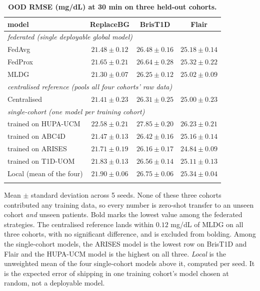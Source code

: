 \documentclass[10pt,letterpaper]{article}
\newlength\savedwidth
\newcommand\thickhline{\noalign{\global\savedwidth\arrayrulewidth\global\arrayrulewidth 2pt}%
\hline
\noalign{\global\arrayrulewidth\savedwidth}}
\begin{document}
\begin{table}[!ht]
\centering
\captionsetup{justification=centering,singlelinecheck=on}
\caption{\bf OOD RMSE (mg/dL) at 30 min on three held-out cohorts.}
\label{tab:ood}
\begin{tabular}{lccc}
\thickhline
model & ReplaceBG & BrisT1D & Flair \\
\hline
\multicolumn{4}{l}{\emph{federated (single deployable global model)}} \\
FedAvg  & $21.48 \pm 0.12$ & $26.48 \pm 0.16$ & $25.18 \pm 0.14$ \\
FedProx & $21.65 \pm 0.21$ & $26.64 \pm 0.28$ & $25.32 \pm 0.22$ \\
MLDG    & $\mathbf{21.30 \pm 0.07}$ & $\mathbf{26.25 \pm 0.12}$ & $\mathbf{25.02 \pm 0.09}$ \\
\hline
\multicolumn{4}{l}{\emph{centralised reference (pools all four cohorts' raw data)}} \\
Centralised & $21.41 \pm 0.23$ & $26.31 \pm 0.25$ & $25.00 \pm 0.23$ \\
\hline
\multicolumn{4}{l}{\emph{single-cohort (one model per training cohort)}} \\
\;trained on HUPA-UCM & $22.58 \pm 0.21$ & $27.85 \pm 0.20$ & $26.23 \pm 0.21$ \\
\;trained on ABC4D    & $21.47 \pm 0.13$ & $26.42 \pm 0.16$ & $25.16 \pm 0.14$ \\
\;trained on ARISES   & $21.71 \pm 0.19$ & $26.16 \pm 0.17$ & $24.84 \pm 0.09$ \\
\;trained on T1D-UOM  & $21.83 \pm 0.13$ & $26.56 \pm 0.14$ & $25.11 \pm 0.13$ \\
Local (mean of the four) & $21.90 \pm 0.06$ & $26.75 \pm 0.06$ & $25.34 \pm 0.04$ \\
\thickhline
\end{tabular}
\begin{center}
{\small Mean $\pm$ standard deviation across 5 seeds. None of these three cohorts
contributed any training data, so every number is zero-shot transfer to an unseen
cohort \emph{and} unseen patients. Bold marks the lowest value among the
federated strategies. The centralised reference lands within $0.12$ mg/dL of
MLDG on all three cohorts, with no significant difference, and is excluded
from bolding. Among the single-cohort models, the ARISES model is the lowest
row on BrisT1D and Flair and the HUPA-UCM model is the highest on all three.
\emph{Local} is the unweighted mean of the four single-cohort models above it,
computed per seed. It is the expected error of shipping in one training
cohort's model chosen at random, not a deployable model.}
\end{center}
\end{table}
\end{document}
